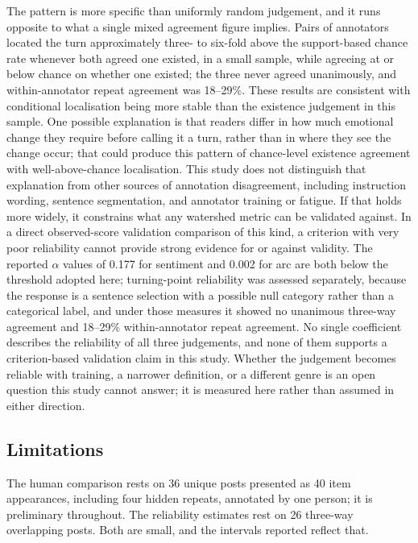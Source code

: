 \documentclass[fleqn,10pt]{wlscirep}
\begin{document}
The pattern is more specific than uniformly random judgement, and it runs opposite to what a single mixed agreement figure implies. Pairs of annotators located the turn approximately three- to six-fold above the support-based chance rate whenever both agreed one existed, in a small sample, while agreeing at or below chance on whether one existed; the three never agreed unanimously, and within-annotator repeat agreement was 18--29\%. These results are consistent with conditional localisation being more stable than the existence judgement in this sample. One possible explanation is that readers differ in how much emotional change they require before calling it a turn, rather than in where they see the change occur; that could produce this pattern of chance-level existence agreement with well-above-chance localisation. This study does not distinguish that explanation from other sources of annotation disagreement, including instruction wording, sentence segmentation, and annotator training or fatigue. If that holds more widely, it constrains what any watershed metric can be validated against. In a direct observed-score validation comparison of this kind, a criterion with very poor reliability cannot provide strong evidence for or against validity. The reported $\alpha$ values of 0.177 for sentiment and 0.002 for arc are both below the threshold adopted here; turning-point reliability was assessed separately, because the response is a sentence selection with a possible null category rather than a categorical label, and under those measures it showed no unanimous three-way agreement and 18--29\% within-annotator repeat agreement. No single coefficient describes the reliability of all three judgements, and none of them supports a criterion-based validation claim in this study. Whether the judgement becomes reliable with training, a narrower definition, or a different genre is an open question this study cannot answer; it is measured here rather than assumed in either direction.

\subsection{Limitations}\label{subsec:limitations}

The human comparison rests on 36 unique posts presented as 40 item appearances, including four hidden repeats, annotated by one person; it is preliminary throughout. The reliability estimates rest on 26 three-way overlapping posts. Both are small, and the intervals reported reflect that.
\end{document}
